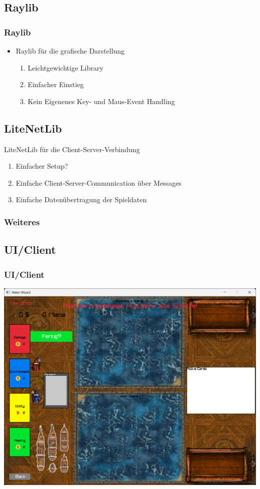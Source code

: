 \documentclass{beamer}
\begin{document}
\subsection{Raylib}
\begin{frame}
  \frametitle{Raylib}
  \begin{itemize}
    \item Raylib für die grafische Darstellung
    \begin{enumerate}
      \item Leichtgewichtige Library
      \item Einfacher Einstieg
      \item Kein Eigenenes Key- und Maus-Event Handling
    \end{enumerate}
  \end{itemize}
\end{frame}

\subsection{LiteNetLib}
\begin{frame}
  LiteNetLib für die Client-Server-Verbindung
    \begin{enumerate}
      \item Einfacher Setup?
      \item Einfache Client-Server-Communication über Messages
      \item Einfache Datenübertragung der Spieldaten
    \end{enumerate}
\end{frame}

\begin{frame}
  \frametitle{Weiteres}
  
\end{frame}

\subsection{UI/Client}
\begin{frame}
  \frametitle{UI/Client}
  \includegraphics[width=\textwidth]{GameScreen.png}
\end{frame}
\end{document}
